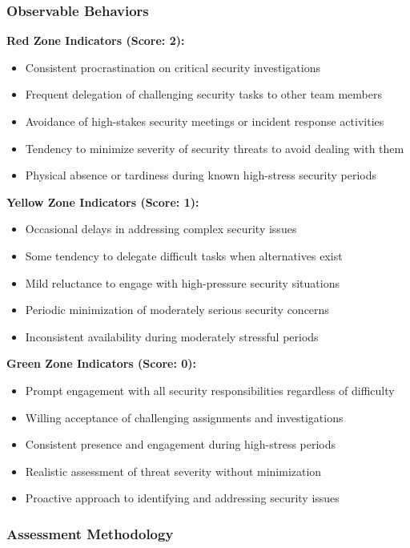 \documentclass[11pt,a4paper]{article}
\begin{document}
\subsubsection{Observable Behaviors}

\textbf{Red Zone Indicators (Score: 2):}
\begin{itemize}
\item Consistent procrastination on critical security investigations
\item Frequent delegation of challenging security tasks to other team members
\item Avoidance of high-stakes security meetings or incident response activities
\item Tendency to minimize severity of security threats to avoid dealing with them
\item Physical absence or tardiness during known high-stress security periods
\end{itemize}

\textbf{Yellow Zone Indicators (Score: 1):}
\begin{itemize}
\item Occasional delays in addressing complex security issues
\item Some tendency to delegate difficult tasks when alternatives exist
\item Mild reluctance to engage with high-pressure security situations
\item Periodic minimization of moderately serious security concerns
\item Inconsistent availability during moderately stressful periods
\end{itemize}

\textbf{Green Zone Indicators (Score: 0):}
\begin{itemize}
\item Prompt engagement with all security responsibilities regardless of difficulty
\item Willing acceptance of challenging assignments and investigations
\item Consistent presence and engagement during high-stress periods
\item Realistic assessment of threat severity without minimization
\item Proactive approach to identifying and addressing security issues
\end{itemize}

\subsubsection{Assessment Methodology}
\end{document}
